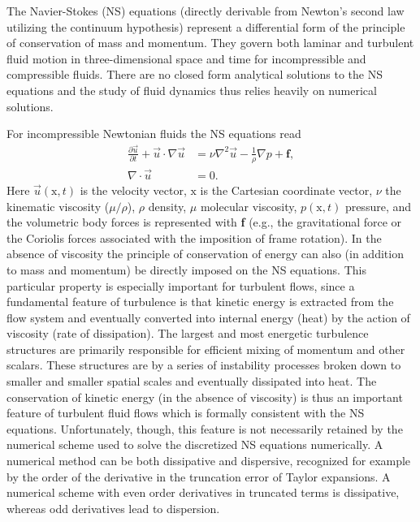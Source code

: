 The Navier-Stokes (NS) equations (directly derivable from Newton's second law utilizing the continuum hypothesis) represent a differential form of the principle of conservation of mass and momentum. They govern both laminar and turbulent fluid motion in three-dimensional space and time for incompressible and compressible fluids. There are no closed form analytical solutions to the NS equations and the study of fluid dynamics thus relies heavily on numerical solutions.

For incompressible Newtonian fluids the NS equations read
\begin{align}
 \frac{\partial \vec{u}}{\partial t}+\vec{u}\cdot \nabla \vec{u} &= \nu \nabla^2 \vec{u} -\frac{1}{\rho} \nabla p +\mathbf{f}, \label{eq:NS}\\
 \nabla \cdot \vec{u} &=0.
 \label{eq:cont}
\end{align}
Here $\vec{u}(\text{x},t)$ is the velocity vector, $\text{x}$ is the Cartesian coordinate vector, $\nu$ the kinematic
viscosity ($\mu/\rho$), $\rho$ density, $\mu$ molecular viscosity, $p(\text{x},t)$ pressure, and the volumetric body forces is represented with \textbf{f} (e.g., the gravitational force or the Coriolis forces associated with the imposition of frame rotation). In the absence of viscosity the principle of conservation of energy can also (in addition to mass and momentum) be directly imposed on the NS equations. This particular property is especially important for turbulent flows, since a fundamental feature of turbulence is that kinetic energy is extracted from the flow system and eventually converted into internal energy (heat) by the action of viscosity (rate of dissipation). The largest and most energetic turbulence structures are primarily responsible for efficient mixing of momentum and other scalars. These structures are by a series of instability processes broken down to smaller and smaller spatial scales and eventually dissipated into heat. The conservation of kinetic energy (in the absence of viscosity) is thus an important feature of turbulent fluid flows which is formally consistent with the NS equations. Unfortunately, though, this feature is not necessarily retained by the numerical scheme used to solve the discretized NS equations numerically. A numerical method can be both dissipative and dispersive, recognized for example by the order of the derivative in the truncation error of Taylor expansions. A numerical scheme with even order derivatives in truncated terms is dissipative, whereas odd derivatives lead to dispersion.
